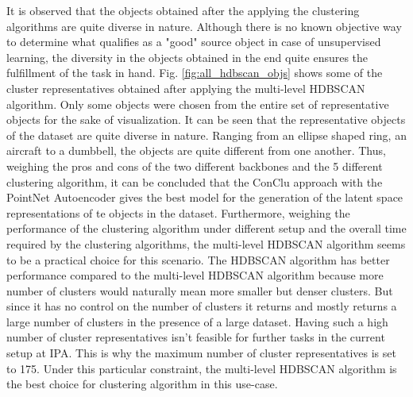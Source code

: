 It is observed that the objects obtained after the applying the clustering algorithms are quite diverse in nature. Although there is no known objective way to determine what qualifies as a "good" source object in case of unsupervised learning, the diversity in the objects obtained in the end quite ensures the fulfillment of the task in hand. Fig. \ref{fig:all_hdbscan_objs} shows some of the cluster representatives obtained after applying the multi-level \ac{HDBSCAN} algorithm. Only some objects were chosen from the entire set of representative objects for the sake of visualization. It can be seen that the representative objects of the dataset are quite diverse in nature. Ranging from an ellipse shaped ring, an aircraft to a dumbbell, the objects are quite different from one another. Thus, weighing the pros and cons of the two different backbones and the 5 different clustering algorithm, it can be concluded that the ConClu approach with the PointNet Autoencoder gives the best model for the generation of the latent space representations of te objects in the dataset. Furthermore, weighing the performance of the clustering algorithm under different setup and the overall time required by the clustering algorithms, the multi-level \ac{HDBSCAN} algorithm seems to be a practical choice for this scenario. The \ac{HDBSCAN} algorithm has better performance compared to the multi-level \ac{HDBSCAN} algorithm because more number of clusters would naturally mean more smaller but denser clusters. But since it has no control on the number of clusters it returns and mostly returns a large number of clusters in the presence of a large dataset. Having such a high number of cluster representatives isn't feasible for further tasks in the current setup at \ac{IPA}. This is why the maximum number of cluster representatives is set to 175. Under this particular constraint, the multi-level \ac{HDBSCAN} algorithm is the best choice for clustering algorithm in this use-case. 